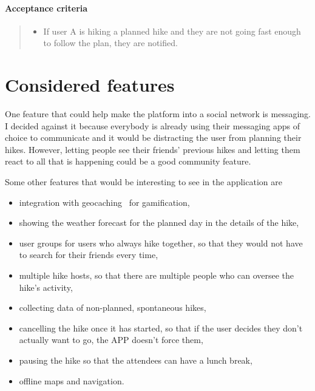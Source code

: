 \paragraph*{Acceptance criteria}
\begin{quote}
\begin{itemize}
    \item If user A is hiking a planned hike and they are not going fast enough to follow the plan, they are notified.
\end{itemize}
\end{quote}


\section{Considered features}
One feature that could help make the platform into a social network is messaging.
I decided against it because everybody is already using their messaging apps of choice to communicate and it would be distracting the user from planning their hikes.
However, letting people see their friends' previous hikes and letting them react to all that is happening could be a good community feature.

Some other features that would be interesting to see in the application are
\begin{itemize}
    \item integration with geocaching~\cite{geocaching} for gamification,
    \item showing the weather forecast for the planned day in the details of the hike,
    \item user groups for users who always hike together, so that they would not have to search for their friends every time,
    \item multiple hike hosts, so that there are multiple people who can oversee the hike's activity,
    \item collecting data of non-planned, spontaneous hikes,
    \item cancelling the hike once it has started, so that if the user decides they don't actually want to go, the APP doesn't force them,
    \item pausing the hike so that the attendees can have a lunch break,
    \item offline maps and navigation.
\end{itemize}

